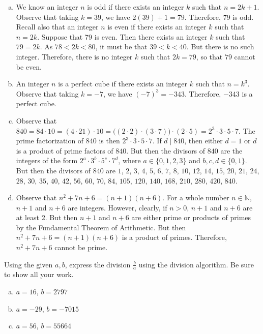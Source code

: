 \documentclass[11pt,letterpaper]{article}
\begin{document}
\sol 
\begin{enumerate}[(a)]
\item We know an integer $n$ is odd if there exists an integer $k$ such that $n= 2k + 1$. Observe that taking $k= 39$, we have $2(39) + 1= 79$. Therefore, $79$ is odd. Recall also that an integer $n$ is even if there exists an integer $k$ such that $n= 2k$. Suppose that 79 is even. Then there exists an integer $k$ such that $79= 2k$. As $78 < 2k < 80$, it must be that $39 < k < 40$. But there is no such integer. Therefore, there is no integer $k$ such that $2k= 79$, so that $79$ cannot be even. \pspace

\item An integer $n$ is a perfect cube if there exists an integer $k$ such that $n= k^3$. Observe that taking $k= -7$, we have $(-7)^3= -343$. Therefore, $-343$ is a perfect cube. \pspace

\item Observe that $840= 84 \cdot 10= (4 \cdot 21) \cdot 10= \big( (2 \cdot 2) \cdot (3 \cdot 7) \big) \cdot (2 \cdot 5)= 2^3 \cdot 3 \cdot 5 \cdot 7$. The prime factorization of $840$ is then $2^3 \cdot 3 \cdot 5 \cdot 7$. If $d \mid 840$, then either $d= 1$ or $d$ is a product of prime factors of $840$. But then the divisors of $840$ are the integers of the form $2^a \cdot 3^b \cdot 5^c \cdot 7^d$, where $a \in \{ 0, 1, 2, 3 \}$ and $b, c, d \in \{ 0, 1 \}$. But then the divisors of $840$ are $1$, $2$, $3$, $4$, $5$, $6$, $7$, $8$, $10$, $12$, $14$, $15$, $20$, $21$, $24$, $28$, $30$, $35$, $40$, $42$, $56$, $60$, $70$, $84$, $105$, $120$, $140$, $168$, $210$, $280$, $420$, $840$. \pspace

\item Observe that $n^2 + 7n + 6= (n + 1)(n + 6)$. For a whole number $n \in \mathbb{N}$, $n + 1$ and $n + 6$ are integers. However, clearly, if $n > 0$, $n + 1$ and $n + 6$ are at least 2. But then $n + 1$ and $n + 6$ are either prime or products of primes by the Fundamental Theorem of Arithmetic. But then $n^2 + 7n + 6= (n + 1)(n + 6)$ is a product of primes. Therefore, $n^2 + 7n + 6$ cannot be prime. 
\end{enumerate}



\newpage



 Using the given $a, b$, express the division $\frac{b}{a}$ using the division algorithm. Be sure to show all your work. 
	\begin{enumerate}[(a)]
	\item $a= 16$, $b= 2797$
	\item $a= -29$, $b= -7015$
	\item $a= 56$, $b= 55664$
	\end{enumerate} \pspace
\end{document}
